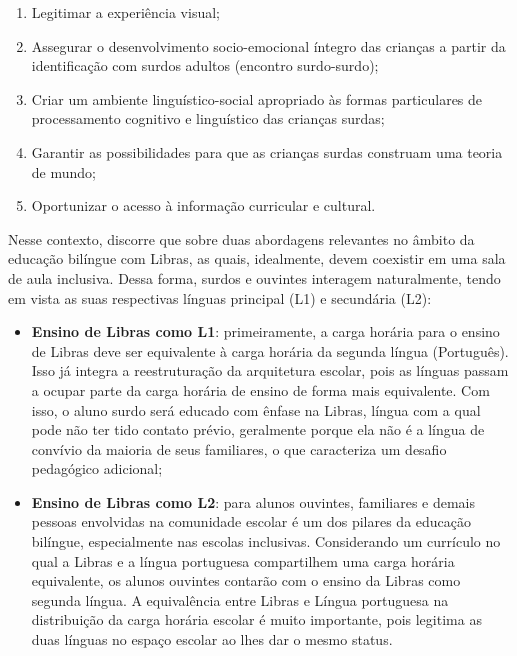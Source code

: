 \begin{enumerate}[label=(\alph*),noitemsep,topsep=0pt]
    \item Legitimar a experiência visual;
    \item Assegurar o desenvolvimento socio-emocional íntegro das crianças a partir da identificação com surdos adultos (encontro surdo-surdo);
    \item Criar um ambiente linguístico-social apropriado às formas particulares de processamento cognitivo e linguístico das crianças surdas;
    \item Garantir as possibilidades para que as crianças surdas construam uma teoria de mundo;
    \item Oportunizar o acesso à informação curricular e cultural.
\end{enumerate}

Nesse contexto,  discorre que sobre duas abordagens relevantes no âmbito da educação bilíngue com Libras, as quais, idealmente, devem coexistir em uma sala de aula inclusiva. Dessa forma, surdos e ouvintes interagem naturalmente, tendo em vista as suas respectivas línguas principal (L1) e secundária (L2):

\begin{itemize}
    \item \textbf{Ensino de Libras como L1}: primeiramente, a carga horária para o ensino de Libras deve ser equivalente à carga horária da segunda língua (Português). Isso já integra a reestruturação da arquitetura escolar, pois as línguas passam a ocupar parte da carga horária de ensino de forma mais equivalente. Com isso, o aluno surdo será educado com ênfase na Libras, língua com a qual pode não ter tido contato prévio, geralmente porque ela não é a língua de convívio da maioria de seus familiares, o que caracteriza um desafio pedagógico adicional;
    \item \textbf{Ensino de Libras como L2}: para alunos ouvintes, familiares e demais pessoas envolvidas na comunidade escolar é um dos pilares da educação bilíngue, especialmente nas escolas inclusivas. Considerando um currículo no qual a Libras e a língua portuguesa compartilhem uma carga horária equivalente, os alunos ouvintes contarão com o ensino da Libras como segunda língua. A equivalência entre Libras e Língua portuguesa na distribuição da carga horária escolar é muito importante, pois legitima as duas línguas no espaço escolar ao lhes dar o mesmo status.
\end{itemize}

